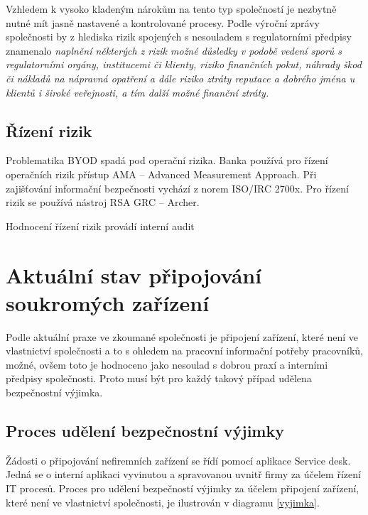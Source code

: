 Vzhledem k vysoko kladeným nárokům na tento typ společností je nezbytně nutné mít jasně nastavené a kontrolované procesy. Podle výroční zprávy společnosti by z hlediska rizik spojených s nesouladem s regulatorními předpisy znamenalo \textit{naplnění některých z rizik  možné důsledky v podobě vedení sporů s regulatorními orgány, institucemi či klienty, riziko finančních pokut, náhrady škod či nákladů na nápravná opatření a dále riziko ztráty reputace a dobrého jména u klientů i široké veřejnosti, a tím další možné finanční ztráty.}

\subsection{Řízení rizik}
Problematika BYOD spadá pod operační rizika. Banka používá pro řízení operačních rizik přístup AMA -- Advanced Measurement Approach. Při zajišťování informační bezpečnosti vychází z norem ISO/IRC 2700x. Pro řízení rizik se používá nástroj RSA GRC -- Archer.

Hodnocení řízení rizik provádí interní audit


\section{Aktuální stav připojování soukromých zařízení}
Podle aktuální praxe ve zkoumané společnosti je připojení zařízení, které není ve vlastnictví společnosti a to s ohledem na pracovní informační potřeby pracovníků, možné, ovšem toto je hodnoceno jako nesoulad s dobrou praxí a interními předpisy společnosti. Proto musí být pro každý takový případ udělena bezpečnostní výjimka.

\subsection{Proces udělení bezpečnostní výjimky}
Žádosti o připojování nefiremních zařízení se řídí pomocí aplikace Service desk. Jedná se o interní aplikaci vyvinutou a spravovanou uvnitř firmy za účelem řízení IT procesů. Proces pro udělení bezpečností výjimky za účelem připojení zařízení, které není ve vlastnictví společnosti, je ilustrován v diagramu \ref{vyjimka}.

